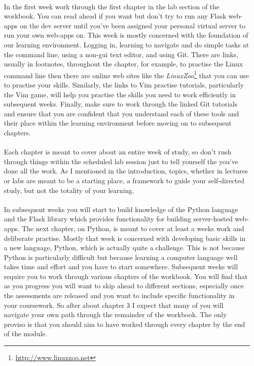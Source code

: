 \paragraph{} In the first week work through the first chapter in the lab section of the workbook. You can read ahead if you want but don't try to run any Flask web-apps on the dev server until you've been assigned your personal virtual server to run your own web-apps on. This week is mostly concerned with the foundation of our learning environment. Logging in, learning to navigate and do simple tasks at the command line, using a non-gui text editor, and using Git. There are links, usually in footnotes, throughout the chapter, for example, to practise the Linux command line then there are online web sites like the \emph{LinuxZoo}\footnote{\url{http://www.linuxzoo.net}} that you can use to practise your skills. Similarly, the links to Vim practise tutorials, particularly the Vim game, will help you practise the skills you need to work efficiently in subsequent weeks. Finally, make sure to work through the linked Git tutorials and ensure that you are confident that you understand each of these tools and their place within the learning environment before moving on to subsequent chapters. 

\paragraph{} Each chapter is meant to cover about an entire week of study, so don't rush through things within the scheduled lab session just to tell yourself the you've done all the work. As I mentioned in the introduction, topics, whether in lectures or labs are meant to be a starting place, a framework to guide your self-directed study, but not the totality of your learning. 

\paragraph{} In subsequent weeks you will start to build knowledge of the Python language and the Flask library which provides functionality for building server-hosted web-apps. The next chapter, on Python, is meant to cover at least a weeks work and deliberate practise. Mostly that week is concerned with developing basic skills in a new language, Python, which is actually quite a challenge. This is not because Python is particularly difficult but because learning a computer language well takes time and effort and you have to start somewhere. Subsequent weeks will require you to work through various chapters of the workbook. You will find that as you progress you will want to skip ahead to different sections, especially once the assessments are released and you want to include specific functionality in your coursework. So after about chapter 3 I expect that many of you will navigate your own path through the remainder of the workbook. The only proviso is that you should aim to have worked through every chapter by the end of the module.


